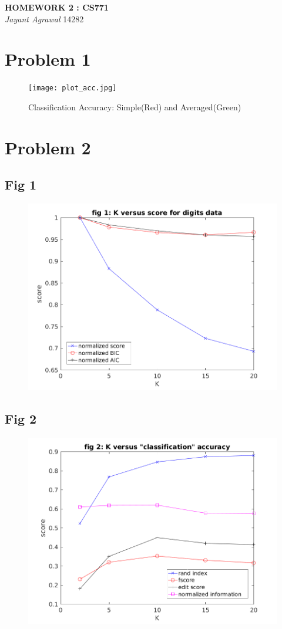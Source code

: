 \documentclass{article}
\begin{document}

\begin{center}
\textbf{\Large HOMEWORK 2 : CS771} \\
\textit{\large Jayant Agrawal}         14282
\end{center}
\section{Problem 1}
\begin{figure}[h!]
\centering
\texttt{[image: plot\_acc.jpg]}
\caption{Classification Accuracy: Simple(Red) and Averaged(Green)}
\label{acc}
\end{figure}

\section{Problem 2}
\subsection{Fig 1}
\begin{figure}[h!]
\begin{center}
\includegraphics[width=0.5\columnwidth]{RunResults2/1.png}
\label{1}
\end{center}
\end{figure}
\newpage
\subsection{Fig 2}
\begin{figure}[h!]
\begin{center}
\includegraphics[width=.5\columnwidth]{RunResults2/2.png}
\label{2}
\end{center}
\end{figure}
\end{document}

